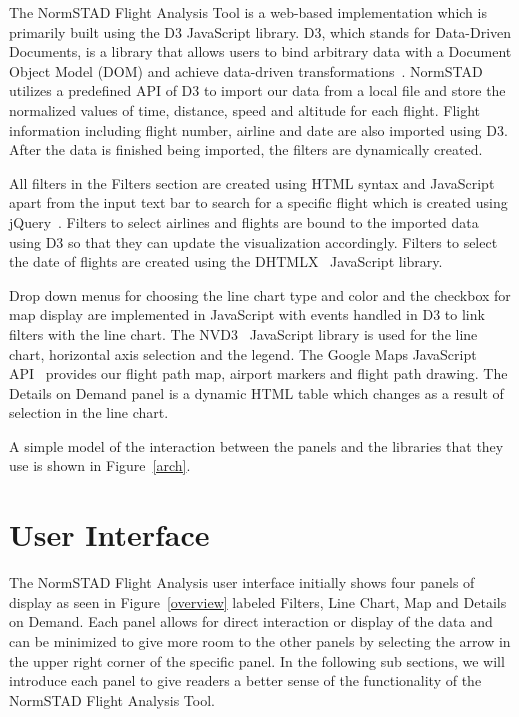 \documentclass{sig-alternate}
\begin{document}
The NormSTAD Flight Analysis Tool is a web-based implementation which is primarily built
using the D3 JavaScript library. D3, which stands for Data-Driven Documents, is a 
library that allows users to bind arbitrary data with a Document Object Model (DOM)
and achieve data-driven transformations~\cite{D3}. NormSTAD utilizes a predefined API of D3
to import our data from a local file
 and store the normalized values of time, distance, speed and altitude
for each flight. Flight information including flight number, airline and date are also imported
using D3. After the data is finished being imported, the filters are dynamically created.

All filters in the Filters section
 are created using HTML syntax and JavaScript apart from the input text bar
to search for a specific flight which is created using jQuery~\cite{jQuery}.
Filters to select airlines and flights are bound to the imported data using D3 so that
they can update the visualization accordingly. Filters to select the date of flights
are created using the DHTMLX~\cite{DHTMLX} JavaScript library.

Drop down menus for choosing the line chart type and color and the checkbox for map display
are implemented in JavaScript with events handled in D3 to link filters with the line chart.
The NVD3~\cite{NVD3} JavaScript library is used for the line chart, horizontal axis 
selection and the legend. The Google Maps JavaScript API~\cite{API} provides our flight path map,
airport markers and flight path drawing. The Details on Demand panel is a dynamic
HTML table which changes as a result of selection in the line chart. 

A simple model of the interaction between the panels and the libraries that they use
is shown in Figure~\ref{arch}.



\section{User Interface}
\label{sec-interface}

The NormSTAD Flight Analysis user interface initially shows four panels of display as seen in 
Figure~\ref{overview} labeled Filters, Line Chart, Map and Details on Demand. Each panel allows for 
direct interaction or display of the data and can be minimized to
give more room to the other panels by selecting 
the arrow in the upper right corner of the specific panel. In the following sub sections, we 
will introduce each panel to give readers a better sense of the functionality of the 
NormSTAD Flight Analysis Tool.
\end{document}
